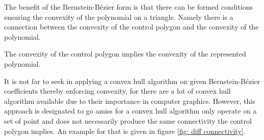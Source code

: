 The benefit of the Bernstein-B\'ezier form is that there can be formed conditions ensuring the convexity of the polynomial on a triangle. Namely there is a connection between the convexity of the control polygon and the convexity of the polynomial.
\begin{theorem}
	The convexity of the control polygon implies the convexity of the represented polynomial.
\end{theorem}
It is not far to seek in applying a convex hull algorithm on given Bernstein-B\'ezier coefficients thereby enforcing convexity, for there are a lot of convex hull algorithm available due to their importance in computer graphics. However, this approach is designated to go amiss for a convex hull algorithm only operate on a set of point and does not necessarily produce the same connectivity the control polygon implies. An example for that is given in figure \ref{fig: diff connectivity}. 

